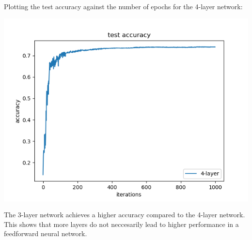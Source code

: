 Plotting the test accuracy against the number of epochs for the 4-layer
network:

\begin{center}
    \includegraphics[width=\imgw]{images/p1a5_4-layer_accuracy.png}   
\end{center}

The 3-layer network achieves a higher accuracy compared to the 4-layer
network. This shows that more layers do not neccesarily lead to higher
performance in a feedforward neural network.
